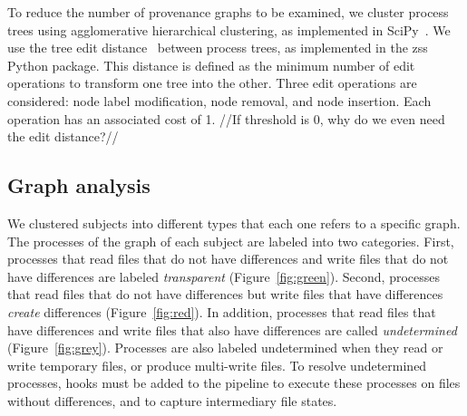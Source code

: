 \documentclass[a4paper,num-refs]{oup-contemporary}
\begin{document}
To reduce the number of provenance graphs to be examined, we cluster
process trees using agglomerative hierarchical clustering, as implemented
in SciPy~\cite{oliphant2007scipy}. We use the tree edit
distance~\cite{zhang1989simple} between process trees, as implemented in
the zss Python package. This distance is defined as the minimum number of
edit operations to transform one tree into the other. Three edit operations
are considered: node label modification, node removal, and node insertion.
Each operation has an associated cost of 1. 
//If threshold is 0, why do we even need the edit distance?//


\subsection{Graph analysis}

We clustered subjects into different types that each one refers to a specific graph.
The processes of the graph of each subject are labeled into two categories. First,
processes that read files that do not have differences and write files that
do not have differences are labeled \emph{transparent}
(Figure~\ref{fig:green}). Second, processes that read files that do not
have differences but write files that have differences \emph{create}
differences (Figure~\ref{fig:red}). In addition, processes that read files
that have differences and write files that also have differences are called
\emph{undetermined} (Figure~\ref{fig:grey}). Processes are also labeled
undetermined when they read or write temporary files, or produce multi-write
files. To resolve undetermined processes, hooks must be added to the pipeline to 
execute these processes on files without differences, and to capture
intermediary file states.
\end{document}
